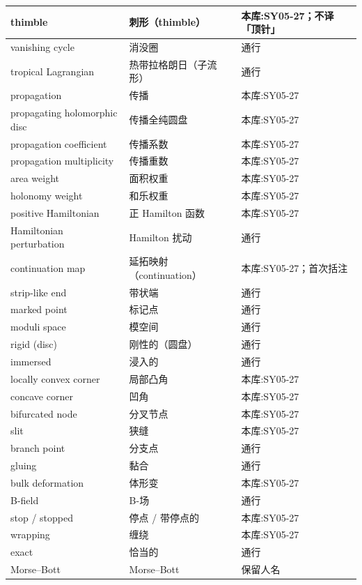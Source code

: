 \begin{longtable}{@{}p{}p{}p{}@{}}
\midrule
thimble & 刺形（thimble） & 本库:SY05-27；不译「顶针」 \\
\midrule
vanishing cycle & 消没圈 & 通行 \\
\midrule
tropical Lagrangian & 热带拉格朗日（子流形） & 通行 \\
\midrule
propagation & 传播 & 本库:SY05-27 \\
\midrule
propagating holomorphic disc & 传播全纯圆盘 & 本库:SY05-27 \\
\midrule
propagation coefficient & 传播系数 & 本库:SY05-27 \\
\midrule
propagation multiplicity & 传播重数 & 本库:SY05-27 \\
\midrule
area weight & 面积权重 & 本库:SY05-27 \\
\midrule
holonomy weight & 和乐权重 & 本库:SY05-27 \\
\midrule
positive Hamiltonian & 正 Hamilton 函数 & 本库:SY05-27 \\
\midrule
Hamiltonian perturbation & Hamilton 扰动 & 通行 \\
\midrule
continuation map & 延拓映射（continuation） & 本库:SY05-27；首次括注 \\
\midrule
strip-like end & 带状端 & 通行 \\
\midrule
marked point & 标记点 & 通行 \\
\midrule
moduli space & 模空间 & 通行 \\
\midrule
rigid (disc) & 刚性的（圆盘） & 通行 \\
\midrule
immersed & 浸入的 & 通行 \\
\midrule
locally convex corner & 局部凸角 & 本库:SY05-27 \\
\midrule
concave corner & 凹角 & 本库:SY05-27 \\
\midrule
bifurcated node & 分叉节点 & 本库:SY05-27 \\
\midrule
slit & 狭缝 & 本库:SY05-27 \\
\midrule
branch point & 分支点 & 通行 \\
\midrule
gluing & 黏合 & 通行 \\
\midrule
bulk deformation & 体形变 & 本库:SY05-27 \\
\midrule
B-field & B-场 & 通行 \\
\midrule
stop / stopped & 停点 / 带停点的 & 本库:SY05-27 \\
\midrule
wrapping & 缠绕 & 本库:SY05-27 \\
\midrule
exact & 恰当的 & 通行 \\
\midrule
Morse–Bott & Morse–Bott & 保留人名 \\

\end{longtable}
